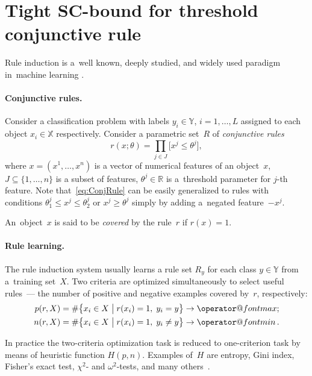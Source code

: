 \documentclass{article}
\makeatletter
\let\cite\citep
\def\RR{\mathbb{R}}
\def\YY{\mathbb{Y}}
\def\XX{\mathbb{X}}
\renewcommand{\geq}{\geqslant}
\renewcommand{\leq}{\leqslant}
\renewcommand{\max}{\mathop{\operator@font max}\limits}
\renewcommand{\min}{\mathop{\operator@font min}\limits}
\renewcommand{\emph}[1]{\textit{#1}}
\makeatother
\begin{document}
\section{Tight SC-bound for threshold conjunctive rule}
\label{sec:RuleLearning}

Rule induction is a~well known, deeply studied, and widely used paradigm in~machine learning
\cite{rivest87learning,cohen99simple,marchand05learning,furnkranz05rocnrule,ruckert08experimental}.

\paragraph{Conjunctive rules.}
Consider a classification problem with labels $y_i\in\YY$, $i=1,\ldots,L$
assigned to each object $x_i\in\XX$ respectively.
Consider a parametric set~$R$ of \emph{conjunctive rules}
\begin{equation}
\label{eq:ConjRule}
    r(x; \theta) = \prod_{j\in J} \bigl[ x^j \leq \theta^j \bigr],
\end{equation}
where  $x=(x^1,\ldots,x^n)$ is a vector of numerical features of an object~$x$,
${J\subseteq \{1,\ldots,n\}}$ is a subset of features,
${\theta^j \in \RR}$ is a~threshold parameter for $j$-th feature.
Note that~\eqref{eq:ConjRule} can be easily generalized to
rules with conditions $\theta_1^j \leq x^j \leq \theta_2^j$ or $x^j \geq \theta^j$
simply by adding a~negated feature~$-x^j$.

An~object~$x$ is said to be \emph{covered} by the rule~$r$ if $r(x)=1$.

\paragraph{Rule learning.}
The rule induction system usually learns a rule set $R_y$ for each class $y\in\YY$ from a~training set~$X$.
Two criteria are optimized simultaneously to select useful rules~---
the number of positive and negative examples covered by~$r$, respectively:
\begin{align*}
    p(r,X)
    &=
    \#\bigl\{
        x_i\in X
    \bigm|
        r(x_i)=1,\; y_i=y
    \bigr\}
    \to\max;
\\
    n(r,X)
    &=
    \#\bigl\{
        x_i\in X
    \bigm|
        r(x_i)=1,\; y_i\neq y
    \bigr\}
    \to\min.
\end{align*}

In practice the two-criteria optimization task is reduced
to one-criterion task by means of heuristic function $H(p,n)$.
Examples of~$H$ are entropy, Gini index, Fisher's exact test, $\chi^2$- and $\omega^2$-tests,
and many others~\cite{furnkranz05rocnrule}.
\end{document}
